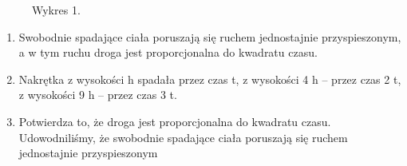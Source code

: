 \documentclass{article}
\begin{document}
	\begin{figure}[htbp!]
		\begin{center}
			\caption{Wykres 1.}
		\end{center}
	\end{figure}
	
	
	\begin{enumerate}
		\item Swobodnie spadające ciała poruszają się ruchem jednostajnie przyspieszonym, a w tym ruchu droga jest proporcjonalna do kwadratu czasu. 
		\item Nakrętka z wysokości h spadała przez czas t, z wysokości 4 h – przez czas 2 t, z wysokości 9 h – przez czas 3 t. 
		\item Potwierdza to, że droga jest proporcjonalna do kwadratu czasu. 
		Udowodniliśmy, że swobodnie spadające ciała poruszają się ruchem jednostajnie przyspieszonym    
	\end{enumerate}
	
\end{document}
